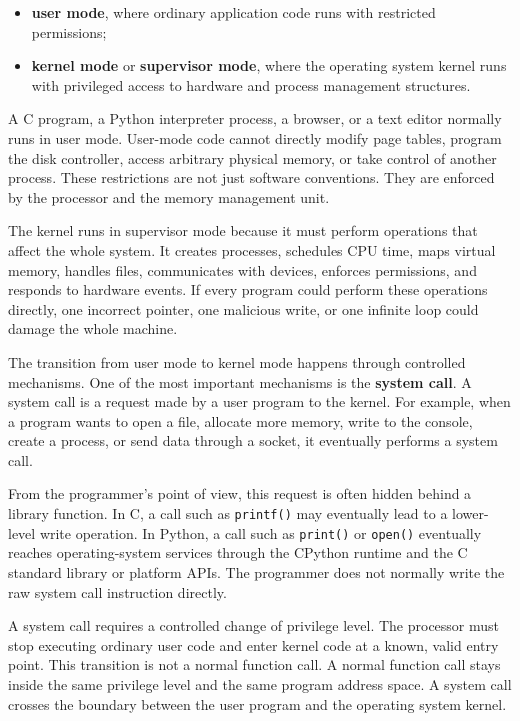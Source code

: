 \documentclass[a4paper,twoside]{report}
\begin{document}
\begin{itemize}
    \item \textbf{user mode}, where ordinary application code runs with restricted permissions;
    \item \textbf{kernel mode} or \textbf{supervisor mode}, where the operating system kernel runs with privileged access to hardware and process management structures.
\end{itemize}

A C program, a Python interpreter process, a browser, or a text editor normally runs in user mode. User-mode code cannot directly modify page tables, program the disk controller, access arbitrary physical memory, or take control of another process. These restrictions are not just software conventions. They are enforced by the processor and the memory management unit.

The kernel runs in supervisor mode because it must perform operations that affect the whole system. It creates processes, schedules CPU time, maps virtual memory, handles files, communicates with devices, enforces permissions, and responds to hardware events. If every program could perform these operations directly, one incorrect pointer, one malicious write, or one infinite loop could damage the whole machine.

The transition from user mode to kernel mode happens through controlled mechanisms. One of the most important mechanisms is the \textbf{system call}. A system call is a request made by a user program to the kernel. For example, when a program wants to open a file, allocate more memory, write to the console, create a process, or send data through a socket, it eventually performs a system call.

From the programmer's point of view, this request is often hidden behind a library function. In C, a call such as \texttt{printf()} may eventually lead to a lower-level write operation. In Python, a call such as \texttt{print()} or \texttt{open()} eventually reaches operating-system services through the CPython runtime and the C standard library or platform APIs. The programmer does not normally write the raw system call instruction directly.

A system call requires a controlled change of privilege level. The processor must stop executing ordinary user code and enter kernel code at a known, valid entry point. This transition is not a normal function call. A normal function call stays inside the same privilege level and the same program address space. A system call crosses the boundary between the user program and the operating system kernel.
\end{document}
